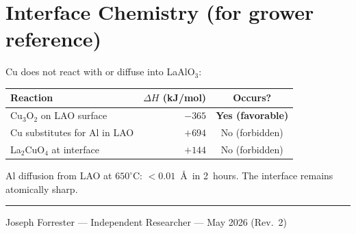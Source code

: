 \documentclass[11pt, a4paper]{article}
\begin{document}
\section{Interface Chemistry (for grower reference)}

Cu does not react with or diffuse into LaAlO$_3$:

\begin{center}
\begin{tabular}{@{}lrc@{}}
\toprule
\textbf{Reaction} & $\Delta H$ (kJ/mol) & \textbf{Occurs?} \\
\midrule
Cu$_3$O$_2$ on LAO surface & $-365$ &
  \textcolor{nm-green}{\textbf{Yes (favorable)}} \\
Cu substitutes for Al in LAO & $+694$ &
  \textcolor{nm-red}{No (forbidden)} \\
La$_2$CuO$_4$ at interface & $+144$ &
  \textcolor{nm-red}{No (forbidden)} \\
\bottomrule
\end{tabular}
\end{center}

Al diffusion from LAO at $650^\circ$C: $< 0.01$~\AA\ in
2~hours. The interface remains atomically sharp.

\vspace{2em}\hrule\vspace{0.5em}
{\color{nm-gray}\small Joseph Forrester --- Independent
Researcher --- May 2026 (Rev.\ 2)}
\end{document}
